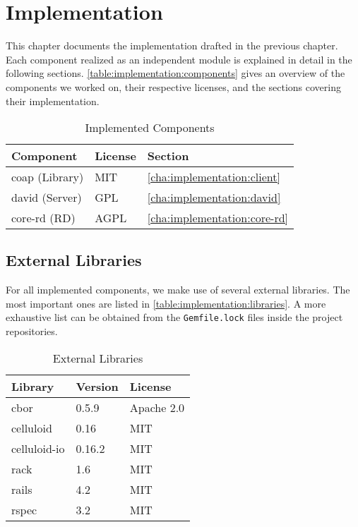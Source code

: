 \chapter{Implementation}
\label{cha:implementation}

This chapter documents the implementation drafted in the previous chapter.
Each component realized as an independent module is explained in detail in the
following sections. \autoref{table:implementation:components} gives an overview
of the components we worked on, their respective licenses, and the sections
covering their implementation.

\begin{table}[H]
	\centering
	\begin{tabular}{l|l|l}
		Component & License & Section\\
		\hline
		coap (Library) & MIT & \ref{cha:implementation:client} \\
		david (Server) & GPL & \ref{cha:implementation:david} \\
		core-rd (\ac{RD}) & AGPL & \ref{cha:implementation:core-rd} \\
	\end{tabular}
	\caption{Implemented Components}
	\label{table:implementation:components}
\end{table}

\section{External Libraries}

	For all implemented components, we make use of several external libraries.
	The most important ones are listed in
	\autoref{table:implementation:libraries}. A more exhaustive list can be
	obtained from the \texttt{Gemfile.lock} files inside the project
	repositories.

	\begin{table}[H]
		\centering
		\begin{tabular}{l|l|l}
			Library			& Version	& License \\
			\hline
			cbor			& 0.5.9		& Apache 2.0 \\
			celluloid		& 0.16		& MIT \\
			celluloid-io	& 0.16.2	& MIT \\
			rack			& 1.6		& MIT \\
			rails			& 4.2		& MIT \\
			rspec			& 3.2		& MIT \\
		\end{tabular}
		\caption{External Libraries}
		\label{table:implementation:libraries}
	\end{table}

